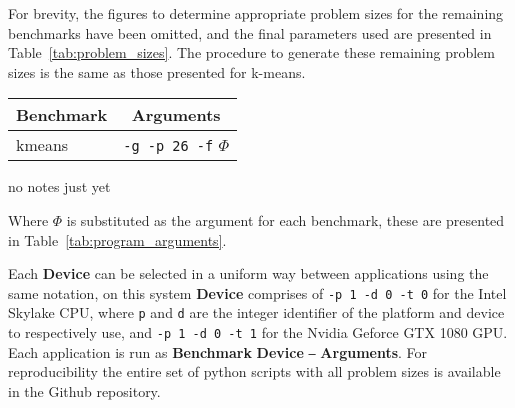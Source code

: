 \documentclass[../document.tex]{subfiles}
\begin{document}
For brevity, the figures to determine appropriate problem sizes for the remaining benchmarks have been omitted, and the final parameters used are presented in Table~\ref{tab:problem_sizes}.
The procedure to generate these remaining problem sizes is the same as those presented for k-means.

\begin{table*}[t]
\centering
\begin{threeparttable}
    \centering
    \caption{Program Arguments}
    \begin{tabular}{l|c}
        \bf Benchmark & \bf Arguments\\\hline
        kmeans & {\tt -g -p 26 -f} $\Phi$
    \end{tabular}
    \begin{tablenotes}
    \item no notes just yet
    \end{tablenotes}
    \label{tab:program_arguments}
\end{threeparttable}
\end{table*}

Where $\Phi$ is substituted as the argument for each benchmark, these are presented in Table~\ref{tab:program_arguments}.

Each {\bf Device} can be selected in a uniform way between applications using the same notation, on this system {\bf Device} comprises of {\tt -p 1 -d 0 -t 0} for the Intel Skylake CPU, where {\tt p} and {\tt d} are the integer identifier of the platform and device to respectively use, and {\tt -p 1 -d 0 -t 1} for the Nvidia Geforce GTX 1080 GPU.
Each application is run as {\bf Benchmark} {\bf Device} {\tt --} {\bf Arguments}.
For reproducibility the entire set of python scripts with all problem sizes is available in the Github repository.  
\end{document}
